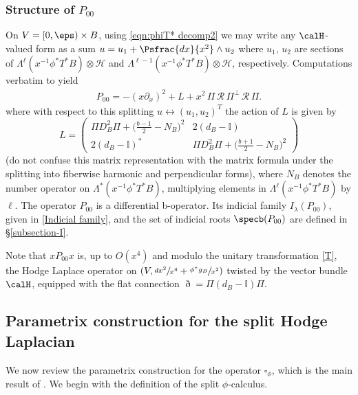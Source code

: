 \subsubsection*{Structure of $P_{00}$}
On $V = [0,\eps)\times B$, using \eqref{eqn:phiT* decomp2} we may write any $\calH$-valued form as a sum
$u = u_1 + \Psfrac{dx}{x^2}\wedge u_2$ where $u_1$, $u_2$ are sections of $\Lambda^\ell (x^{-1} \phi^*T^*B) \otimes
\mathscr{H}$ and $\Lambda^{\ell-1} (x^{-1} \phi^*T^*B) \otimes
\mathscr{H}$, respectively.
Computations verbatim to \cite[(15)]{guillarmou2014low} yield
\begin{align}\label{indicial-operator-2}
P_{00}
= -(x\partial_x)^{2} + L + x^2 \,\Pi \,\mathscr{R} \,\Pi^\perp \,\mathscr{R} \,\Pi.
\end{align}
where with respect to this splitting $u \leftrightarrow (u_1,u_2)^T$ the action of $L$
is given by
\begin{equation}\label{LL}
L = \left(\begin{array}{cc}
\Pi D^2_{B} \Pi + \bigl(\frac{b-1}2-N_B\bigr)^{2} &2(d_B - \mathbb{I}) \\
2(d_B - \mathbb{I})^* & \Pi D^2_B \Pi + \bigl(\frac{b+1}2-N_B\bigr)^{2}
\end{array} \right)
\end{equation}
(do not confuse this matrix representation with
the matrix formula under the splitting into fiberwise harmonic and perpendicular forms),
where $N_B$ denotes the number opera\-tor on $\Lambda^*(x^{-1} \phi^*T^*B)$,
multiplying elements in $\Lambda^\ell(x^{-1} \phi^*T^*B)$ by $\ell$. The operator
$P_{00}$ is a differential b-operator. Its indicial family $I_\lambda(P_{00})$, given in \eqref{Indicial family},
and the set of indicial roots $\specb(P_{00})$ are defined in \S \ref{subsection-I}.

Note that $xP_{00}x$ is, up to $O(x^4)$ and modulo the unitary transformation \eqref{T}, the Hodge Laplace operator on $(V, \sfrac{dx^2}{x^4}+ \sfrac{\phi^*g_B}{x^2})$ twisted by the vector bundle~$\calH$, equipped with the flat connection $\eth = \Pi(d_{B} - \mathbb{I})\Pi$.

\subsection{Parametrix construction for the split Hodge Laplacian} \label{review grieser-para}
We now review the parametrix construction for the operator $\square_\phi$,
which is the main result of \cite{grieser-para}. We begin with the definition
of the split $\phi$-calculus.

